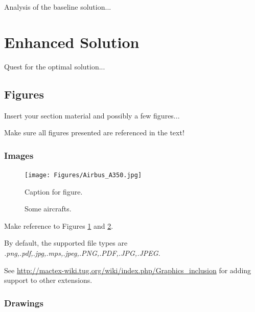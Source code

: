 Analysis of the baseline solution...


\section{Enhanced Solution}
\label{section:enhanced}

Quest for the optimal solution...


\subsection{Figures}
\label{subsection:figures}

Insert your section material and possibly a few figures...

Make sure all figures presented are referenced in the text!


\subsubsection{Images}
\label{subsection:images}

\begin{figure}[!htb]
  \centering
  \texttt{[image: Figures/Airbus\_A350.jpg]}
  \caption[Caption for figure in TOC.]{Caption for figure.}
  \label{fig:airbus1}
\end{figure}

\begin{figure}[!htb]
  \begin{subfigmatrix}{2}
  \end{subfigmatrix}
  \caption{Some aircrafts.}
  \label{fig:aircrafts}
\end{figure}

Make reference to Figures \ref{fig:airbus1} and \ref{fig:aircrafts}.

By default, the supported file types are {\it .png,.pdf,.jpg,.mps,.jpeg,.PNG,.PDF,.JPG,.JPEG}.

See \url{http://mactex-wiki.tug.org/wiki/index.php/Graphics_inclusion} for adding support to other extensions.


\subsubsection{Drawings}
\label{subsection:drawings}

